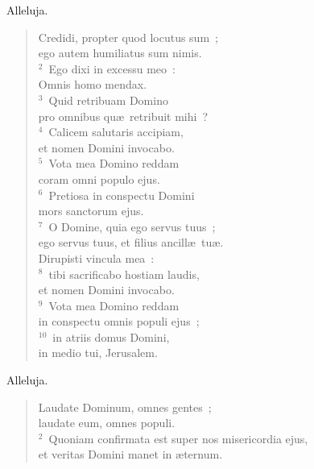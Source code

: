 \lettrine[lines=3,image=true,loversize=0.05,lraise=-0.03]{A}{}lleluja. \begin{flushleft}\begin{verse}\vspace{6pt}Credidi, propter quod locutus sum~;\\ ego autem humiliatus sum nimis.\\
${}^{2}$~Ego dixi in excessu meo~:\\ Omnis homo mendax.\\
${}^{3}$~Quid retribuam Domino\\ pro omnibus qu\ae\ retribuit mihi~?\\
${}^{4}$~Calicem salutaris accipiam,\\ et nomen Domini invocabo.\\
${}^{5}$~Vota mea Domino reddam\\ coram omni populo ejus.\\
${}^{6}$~Pretiosa in conspectu Domini\\ mors sanctorum ejus.\\
${}^{7}$~O Domine, quia ego servus tuus~;\\ ego servus tuus, et filius ancill\ae\ tu\ae .\\ Dirupisti vincula mea~:\\
${}^{8}$~tibi sacrificabo hostiam laudis,\\ et nomen Domini invocabo.\\
${}^{9}$~Vota mea Domino reddam\\ in conspectu omnis populi ejus~;\\
${}^{10}$~in atriis domus Domini,\\ in medio tui, Jerusalem.\end{verse}\end{flushleft}



\lettrine[lines=3,image=true,loversize=0.05,lraise=-0.03]{A}{}lleluja. \begin{flushleft}\begin{verse}\vspace{6pt}Laudate Dominum, omnes gentes~;\\ laudate eum, omnes populi.\\
${}^{2}$~Quoniam confirmata est super nos misericordia ejus,\\ et veritas Domini manet in \ae ternum.\end{verse}\end{flushleft}



